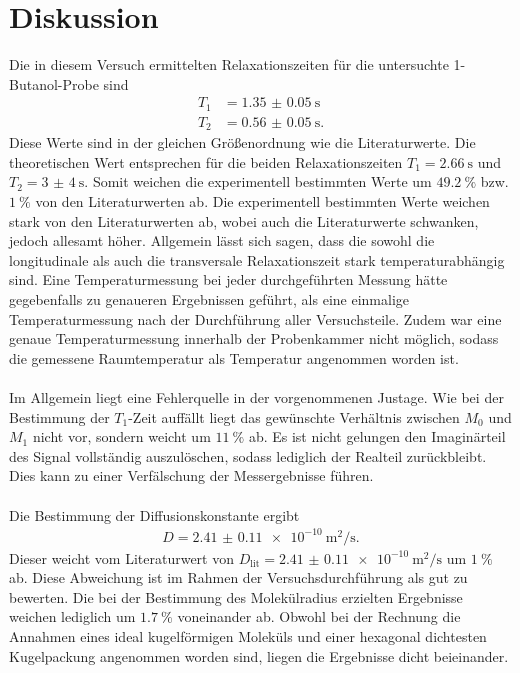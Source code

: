 \section{Diskussion}
Die in diesem Versuch ermittelten Relaxationszeiten für die untersuchte 1-Butanol-Probe sind
\begin{align}
  T_1 &= \SI{1.35(005)}{\second} \\
  T_2 &= \SI{0.56(005)}{\second} .
\end{align}
Diese Werte sind in der gleichen Größenordnung wie die Literaturwerte. Die theoretischen Wert entsprechen
für die beiden Relaxationszeiten  $T_1 = \SI{2.66}{\second}$ \cite{T1} und $T_2 = \SI{3(4)}{\second}$. 
Somit weichen die experimentell bestimmten Werte um $\SI{49.2}{\percent}$ bzw. $\SI{1}{\percent}$ von den Literaturwerten ab.
Die experimentell bestimmten Werte weichen stark von den Literaturwerten ab, wobei auch die Literaturwerte schwanken, jedoch
allesamt höher.
Allgemein lässt sich sagen, dass die sowohl die longitudinale als auch die transversale Relaxationszeit stark temperaturabhängig
sind. Eine Temperaturmessung bei jeder durchgeführten Messung hätte gegebenfalls zu genaueren Ergebnissen geführt,
als eine einmalige Temperaturmessung nach der Durchführung aller Versuchsteile. 
Zudem war eine genaue Temperaturmessung innerhalb der Probenkammer nicht möglich, sodass die gemessene Raumtemperatur als
Temperatur angenommen worden ist. \\
\\
Im Allgemein liegt eine Fehlerquelle in der vorgenommenen Justage. Wie bei der Bestimmung der $T_1$-Zeit auffällt liegt 
das gewünschte Verhältnis zwischen $M_0$ und $M_1$ nicht vor, sondern weicht um $\SI{11}{\percent}$ ab. 
Es ist nicht gelungen den Imaginärteil des Signal vollständig auszulöschen, sodass lediglich der Realteil zurückbleibt.
Dies kann zu einer Verfälschung der Messergebnisse führen. \\
\\
Die Bestimmung der Diffusionskonstante ergibt
\begin{align}
  D = \SI{2.41(011)e-10}{\square\meter\per\second}.
\end{align}
Dieser weicht vom Literaturwert von $D_\text{lit} = \SI{2.41(011)e-10}{\square\meter\per\second}$ \cite{Diff} um
$\SI{1}{\percent}$ ab. Diese Abweichung ist im Rahmen der Versuchsdurchführung als gut zu bewerten.
Die bei der Bestimmung des Molekülradius erzielten Ergebnisse weichen lediglich um $\SI{1.7}{\percent}$ voneinander ab. 
Obwohl bei der Rechnung die Annahmen eines ideal kugelförmigen Moleküls und einer hexagonal dichtesten Kugelpackung 
angenommen worden sind, liegen die Ergebnisse dicht beieinander. 

